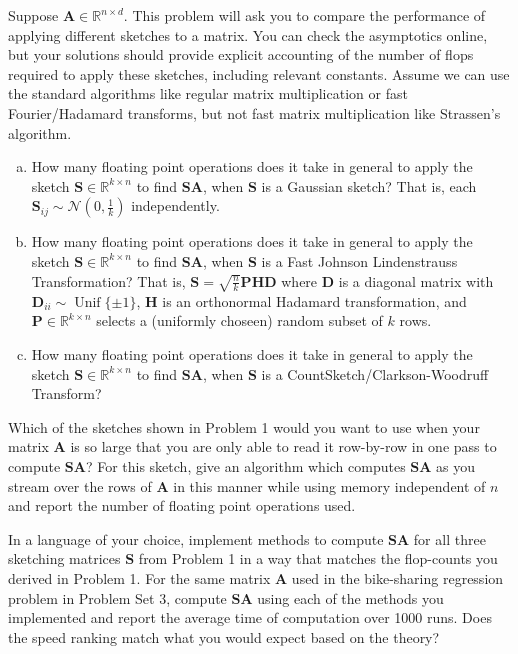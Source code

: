 \documentclass[12pt,letterpaper,cm]{hmcpset}
\newcommand\R{\mathbb{R}}
\newcommand\A{\boldsymbol{A}}
\renewcommand\P{\boldsymbol{P}}
\renewcommand\S{\boldsymbol{S}}
\renewcommand\H{\boldsymbol{H}}
\newcommand\D{\boldsymbol{D}}
\begin{document}
\begin{problem}[1]
    Suppose $\A\in\R^{n\times d}$. This problem will ask you to compare the performance of applying different sketches to a matrix. You can check the asymptotics online, but your solutions should provide explicit accounting of the number of flops required to apply these sketches, including relevant constants. Assume we can use the standard algorithms like regular matrix multiplication or fast Fourier/Hadamard transforms, but not fast matrix multiplication like Strassen's algorithm.
    \begin{enumerate}[(a)]
        \item How many floating point operations does it take in general to apply the sketch $\S\in\R^{k\times n}$ to find $\S\A$, when $\S$ is a Gaussian sketch? That is, each $\S_{ij} \sim \mathcal{N}(0,\tfrac{1}{k})$ independently.
        \item How many floating point operations does it take in general to apply the sketch $\S\in\R^{k\times n}$ to find $\S\A$, when $\S$ is a Fast Johnson Lindenstrauss Transformation? That is, $\S = \sqrt{\tfrac{n}{k}}\P\H\D$ where $\D$ is a diagonal matrix with $\D_{ii}\sim \operatorname{Unif}\{\pm 1\}$, $\H$ is an orthonormal Hadamard transformation, and $\P\in\R^{k\times n}$ selects a (uniformly choseen) random subset of $k$ rows.
        \item How many floating point operations does it take in general to apply the sketch $\S\in\R^{k\times n}$ to find $\S\A$, when $\S$ is a CountSketch/Clarkson-Woodruff Transform?
    \end{enumerate}
\end{problem}

\begin{solution}
    \vfill
\end{solution}

\begin{problem}[2]
    Which of the sketches shown in Problem 1 would you want to use when your matrix $\A$ is so large that you are only able to read it row-by-row in one pass to compute $\S\A$? For this sketch, give an algorithm which computes $\S\A$ as you stream over the rows of $\A$ in this manner while using memory independent of $n$ and report the number of floating point operations used.
\end{problem}

\begin{solution}
    \vfill
\end{solution}

\begin{problem}[3]
    In a language of your choice, implement methods to compute $\S\A$ for all three sketching matrices $\S$ from Problem 1 in a way that matches the flop-counts you derived in Problem 1. For the same matrix $\A$ used in the bike-sharing regression problem in Problem Set 3, compute $\S\A$ using each of the methods you implemented and report the average time of computation over 1000 runs. Does the speed ranking match what you would expect based on the theory?
\end{problem}

\begin{solution}
    \vfill
\end{solution}
\clearpage
\end{document}
